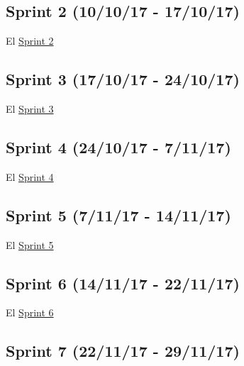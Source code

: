 
\subsection{Sprint 2 (10/10/17 -
	17/10/17)}\label{sprint-2-101017---171017}

El \href{https://github.com/trona85/GII-17.1B-UBULog-1.0/milestone/2?closed=1}{Sprint 2}


\subsection{Sprint 3 (17/10/17 -
	24/10/17)}\label{sprint-3-171017---241017}

El \href{https://github.com/trona85/GII-17.1B-UBULog-1.0/milestone/3?closed=1}{Sprint 3} 


\subsection{Sprint 4 (24/10/17 -
	7/11/17)}\label{sprint-4-241017---071117}

El \href{https://github.com/trona85/GII-17.1B-UBULog-1.0/milestone/4?closed=1}{Sprint 4} 


\subsection{Sprint 5 (7/11/17 -
	14/11/17)}\label{sprint-5-071117---141117}

El \href{https://github.com/trona85/GII-17.1B-UBULog-1.0/milestone/5?closed=1}{Sprint 5} 


\subsection{Sprint 6 (14/11/17 -
	22/11/17)}\label{sprint-6-141117---221117}

El \href{https://github.com/trona85/GII-17.1B-UBULog-1.0/milestone/6?closed=1}{Sprint 6} 


\subsection{Sprint 7 (22/11/17 -
	29/11/17)}\label{sprint-7-221117---291117}

